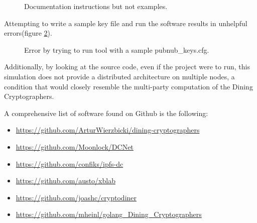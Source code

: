 \begin{figure}[H]
    \centering
    \caption{Documentation instructions but not examples.}
    \label{fig:work2documentation}
\end{figure}

Attempting to write a sample key file and run the software results in unhelpful errors(figure \ref{fig:work2error}). 
 
\begin{figure}[H]
    \centering
    \caption{Error by trying to run tool with a sample pubnub{\_}keys.cfg.}
    \label{fig:work2error}
\end{figure}

Additionally, by looking at the source code, even if the project were to run, this simulation does not provide a distributed architecture on multiple nodes, a condition that would closely resemble the multi-party computation of the Dining Cryptographers. \newline


A comprehensive list of software found on Github is the following: 
\begin{itemize}
    \item \url{https://github.com/ArturWierzbicki/dining-cryptographers}
    \item \url{https://github.com/Moonlock/DCNet}
    \item \url{https://github.com/confiks/ipfs-dc}
    \item \url{https://github.com/austo/xblab}
    \item \url{https://github.com/joashc/cryptodiner}
    \item \url{https://github.com/mheinl/golang_Dining_Cryptographers}
\end{itemize}


